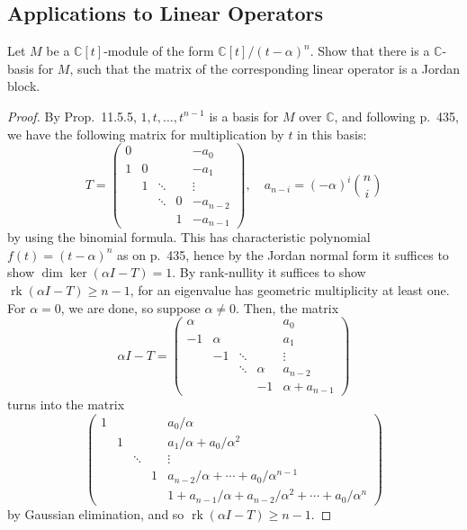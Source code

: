 \documentclass[12pt]{article}
\theoremstyle{remark}
\begin{document}
\subsection{Applications to Linear Operators}
\setcounter{subsubsection}{1}
\begin{problem}
  Let $M$ be a $\mathbb{C}[t]$-module of the form $\mathbb{C}[t]/(t-\alpha)^n$. Show that there is a $\mathbb{C}$-basis for $M$, such that the matrix of the corresponding linear operator is a Jordan block.
\end{problem}
\begin{proof}
  By Prop.~11.5.5, $1,t,\ldots,t^{n-1}$ is a basis for $M$ over $\mathbb{C}$, and following p.~435, we have the following matrix for multiplication by $t$ in this basis:
  \begin{equation*}
    T = \begin{pmatrix}
      0 & & & & -a_0\\
      1 & 0 & & & -a_1\\
      & 1 & \ddots & & \vdots\\
      & & \ddots & 0 & -a_{n-2}\\
      & & & 1 & -a_{n-1}
    \end{pmatrix}, \quad a_{n-i} = (-\alpha)^{i}\binom{n}{i}
  \end{equation*}
  by using the binomial formula. This has characteristic polynomial $f(t) = (t-\alpha)^n$ as on p.~435, hence by the Jordan normal form it suffices to show $\dim\ker(\alpha I-T) = 1$. By rank-nullity it suffices to show $\operatorname{rk}(\alpha I-T) \ge n-1$, for an eigenvalue has geometric multiplicity at least one. For $\alpha=0$, we are done, so suppose $\alpha\ne0$. Then, the matrix
  \begin{equation*}
    \alpha I - T = \begin{pmatrix}
      \alpha & & & & a_0\\
      -1 & \alpha & & & a_1\\
      & -1 & \ddots & & \vdots\\
      & & \ddots & \alpha & a_{n-2}\\
      & & & -1 & \alpha+a_{n-1}
    \end{pmatrix}
  \end{equation*}
  turns into the matrix
  \begin{equation*}
    \begin{pmatrix}
      1 & & & & a_0/\alpha\\
       & 1 & & & a_1/\alpha+a_0/\alpha^2\\
      &  & \ddots & & \vdots\\
      & & & 1 & a_{n-2}/\alpha+\cdots+a_0/\alpha^{n-1}\\
      & & & & 1+a_{n-1}/\alpha + a_{n-2}/\alpha^2+\cdots+a_0/\alpha^{n}
    \end{pmatrix}
  \end{equation*}
  by Gaussian elimination, and so $\operatorname{rk}(\alpha I - T) \ge n-1$.
\end{proof}
\end{document}
